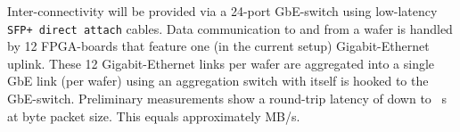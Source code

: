 \documentclass[12pt,oneside]{scrartcl}
\begin{document}
Inter-connectivity will be provided via a 24-port \unit[10]{GbE}-switch using low-latency \texttt{SFP+ direct attach} cables.
%
Data communication to and from a wafer is handled by 12 FPGA-boards that feature one (in the current setup) Gigabit-Ethernet uplink.
%
These 12 Gigabit-Ethernet links per wafer are aggregated into a single \unit[10]{GbE} link (per wafer) using an aggregation switch with itself is hooked to the \unit[10]{GbE}-switch.
%
Preliminary measurements show a round-trip latency of down to \unit[10]{\textmu{}s} at \unit[2048]{byte} packet size.
%
This equals approximately \unit[500]{MB/s}.




\end{document}
